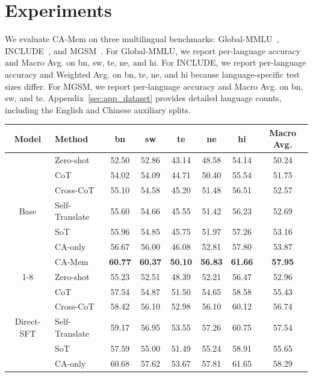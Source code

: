 \documentclass[11pt]{article}
\begin{document}
\section{Experiments}

We evaluate CA-Mem on three multilingual benchmarks: Global-MMLU~\citep{singh2025global}, INCLUDE~\citep{romanou2025include}, and MGSM~\citep{shi2022language}. For Global-MMLU, we report per-language accuracy and Macro Avg. on bn, sw, te, ne, and hi. For INCLUDE, we report per-language accuracy and Weighted Avg. on bn, te, ne, and hi because language-specific test sizes differ. For MGSM, we report per-language accuracy and Macro Avg. on bn, sw, and te. Appendix~\ref{sec:app_dataset} provides detailed language counts, including the English and Chinese auxiliary splits.

\begin{table}[t]
\centering
\scriptsize
\setlength{\tabcolsep}{2.2pt}
\renewcommand{\arraystretch}{0.90}
\begin{tabular*}{\textwidth}{@{\extracolsep{\fill}} c l c c c c c c}
\hline
Model & Method & bn & sw & te & ne & hi & Macro Avg. \\
\hline
 & Zero-shot & 52.50 & 52.86 & 43.14 & 48.58 & 54.14 & 50.24 \\
 & CoT & 54.02 & 54.09 & 44.71 & 50.40 & 55.54 & 51.75 \\
 & Cross-CoT & 55.10 & 54.58 & 45.20 & 51.48 & 56.51 & 52.57 \\
Base & Self-Translate & 55.60 & 54.66 & 45.55 & 51.42 & 56.23 & 52.69 \\
 & SoT & 55.96 & 54.85 & 45.75 & 51.97 & 57.26 & 53.16 \\
 & CA-only & 56.67 & 56.00 & 46.08 & 52.81 & 57.80 & 53.87 \\
 & CA-Mem & \textbf{60.77} & \textbf{60.37} & \textbf{50.10} & \textbf{56.83} & \textbf{61.66} & \textbf{57.95} \\
\cline{1-8}
 & Zero-shot & 55.23 & 52.51 & 48.39 & 52.21 & 56.47 & 52.96 \\
 & CoT & 57.54 & 54.87 & 51.50 & 54.65 & 58.58 & 55.43 \\
 & Cross-CoT & 58.42 & 56.10 & 52.98 & 56.10 & 60.12 & 56.74 \\
Direct-SFT & Self-Translate & 59.17 & 56.95 & 53.55 & 57.26 & 60.75 & 57.54 \\
 & SoT & 57.59 & 55.00 & 51.49 & 55.24 & 58.91 & 55.65 \\
 & CA-only & 60.68 & 57.62 & 53.67 & 57.81 & 61.65 & 58.29 \\

\end{tabular*}
\end{table}
\end{document}
